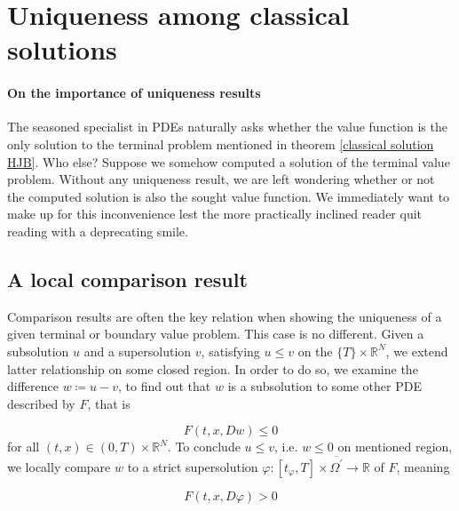 
\section{Uniqueness among classical solutions}

	\paragraph{On the importance of uniqueness results}
	\label{importance uniqueness}
	
	The seasoned specialist in PDEs naturally asks whether the value function is the only solution to the terminal problem mentioned in theorem \ref{classical solution HJB}. Who else? Suppose we somehow computed a solution of the terminal value problem. Without any uniqueness result, we are left wondering whether or not the computed solution is also the sought value function. We immediately want to make up for this inconvenience lest the more practically inclined reader quit reading with a deprecating smile.

	\subsection{A local comparison result}
	
		Comparison results are often the key relation when showing the uniqueness of a given terminal or boundary value problem. This case is no different. Given a subsolution $ u $ and a supersolution $ v $, satisfying $ u \leq v $ on the  $ \{ T \} \times \mathbb{R}^N $, we extend latter relationship on some closed region. In order to do so, we examine the difference $ w \coloneqq u - v $, to find out that $ w $ is a subsolution to some other PDE described by $ F $, that is
		
		\begin{equation*}
			F(t, x, Dw) \leq 0
		\end{equation*}
		for all $ (t, x) \in \left(0, T \right) \times \mathbb{R}^N $.
		To conclude $ u \leq v $, i.e. $ w \leq 0 $ on mentioned region, we locally compare $ w $ to a strict supersolution $ \varphi : \left[ t_{\varphi}, T \right] \times \overline{\Omega^{\prime}} \to \mathbb{R} $ of $ F $, meaning
		
		\begin{equation*}
			F(t, x, D\varphi) > 0
		\end{equation*}
		
